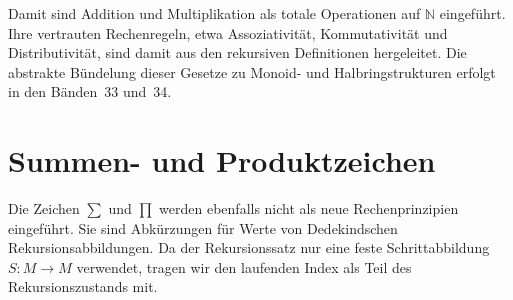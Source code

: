 \documentclass[main.tex]{subfiles}
\begin{document}
\begin{tabproofwide}
\end{tabproofwide}

Damit sind Addition und Multiplikation als totale Operationen auf
\(\mathbb{N}\) eingeführt. Ihre vertrauten Rechenregeln, etwa Assoziativität,
Kommutativität und Distributivität, sind damit aus den rekursiven Definitionen
hergeleitet. Die abstrakte Bündelung dieser Gesetze zu Monoid- und
Halbringstrukturen erfolgt in den Bänden~33 und~34.

\section{Summen- und Produktzeichen}

Die Zeichen \(\sum\) und \(\prod\) werden ebenfalls nicht als neue
Rechenprinzipien eingeführt. Sie sind Abkürzungen für Werte von
Dedekindschen Rekursionsabbildungen. Da der Rekursionssatz nur eine feste
Schrittabbildung \(S\colon M\to M\) verwendet, tragen wir den laufenden Index
als Teil des Rekursionszustands mit.
\end{document}
